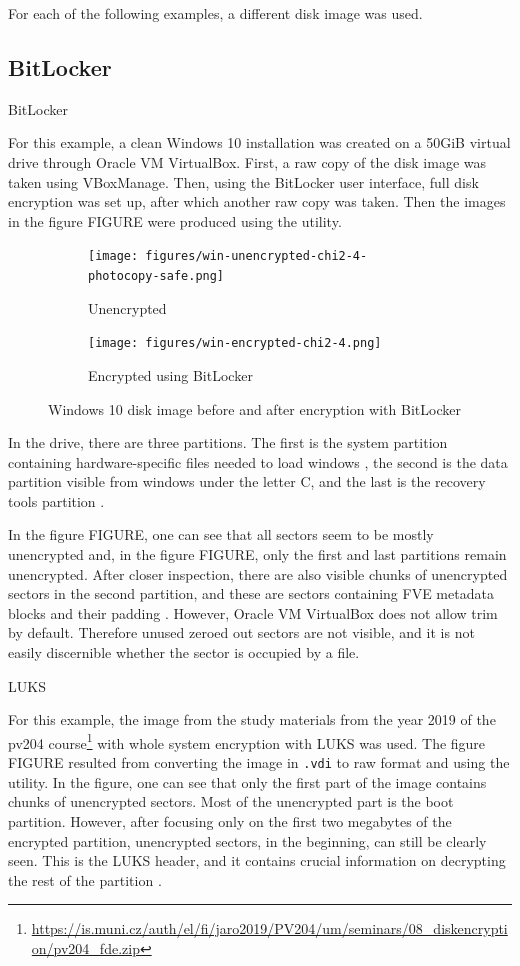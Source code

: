 \documentclass[
  digital, %
  oneside, %
  lof,     %
  lot,     %
]{fithesis4}
\begin{document}
For each of the following examples, a different disk image was used.

\subsection{BitLocker}

BitLocker

For this example, a clean Windows 10 installation was created on a 50GiB virtual drive through Oracle VM VirtualBox.
First, a raw copy of the disk image was taken using VBoxManage.
Then, using the BitLocker user interface, full disk encryption was set up, after which another raw copy was taken.
Then the images in the figure FIGURE were produced using the utility.

\begin{figure}
  \centering
  \begin{subfigure}[t]{.45\textwidth}
    \centering
    \texttt{[image: figures/win-unencrypted-chi2-4-photocopy-safe.png]}
    \caption{Unencrypted}
    \label{fig:idk-unenc}
  \end{subfigure}
  \hfill
  \begin{subfigure}[t]{.45\textwidth}
    \centering
    \texttt{[image: figures/win-encrypted-chi2-4.png]}
    \caption{Encrypted using BitLocker}
    \label{fig:idk-enc}
  \end{subfigure}
  \caption{Windows 10 disk image before and after encryption with BitLocker}
  \label{fig:idk}
\end{figure}

In the drive, there are three partitions.
The first is the system partition containing hardware-specific files needed to load windows \cite{winpart}, the second is the data partition visible from windows under the letter C, and the last is the recovery tools partition \cite{winbiospart}.

In the figure FIGURE, one can see that all sectors seem to be mostly unencrypted and, in the figure FIGURE, only the first and last partitions remain unencrypted.
After closer inspection, there are also visible chunks of unencrypted sectors in the second partition, and these are sectors containing FVE metadata blocks and their padding \cite{metz22}.
However, Oracle VM VirtualBox does not allow trim by default. Therefore unused zeroed out sectors are not visible, and it is not easily discernible whether the sector is occupied by a file.

LUKS

For this example, the image from the study materials from the year 2019 of the pv204 course\footnote{\url{https://is.muni.cz/auth/el/fi/jaro2019/PV204/um/seminars/08_diskencryption/pv204_fde.zip}} with whole system encryption with LUKS was used.
The figure FIGURE resulted from converting the image in \texttt{.vdi} to raw format and using the utility.
In the figure, one can see that only the first part of the image contains chunks of unencrypted sectors.
Most of the unencrypted part is the boot partition.
However, after focusing only on the first two megabytes of the encrypted partition, unencrypted sectors, in the beginning, can still be clearly seen.
This is the LUKS header, and it contains crucial information on decrypting the rest of the partition \cite{faqcryptsetupluks}.
\end{document}
